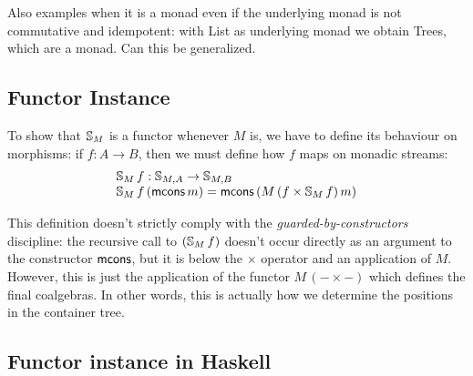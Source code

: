 \documentclass{article}
\begin{document}
Also examples when it is a monad even if the underlying monad is not commutative and idempotent: with List as underlying monad we obtain Trees, which are a monad. Can this be generalized.

\subsection{Functor Instance}

To show that $\mathbb{S}_{M}$ is a functor whenever $M$ is, we have to define its behaviour on morphisms: if $f:A\rightarrow B$, then we must define how $f$ maps on monadic streams:
$$
\begin{array}{l}
\mathbb{S}_{M}\,f : \mathbb{S}_{M,A} \rightarrow \mathbb{S}_{M,B}\\
\mathbb{S}_{M}\,f\,(\mathsf{mcons}\,m) = \mathsf{mcons}\,(M\,(f\times \mathbb{S}_{M}\,f)\,m)
\end{array}
$$

This definition doesn't strictly comply with the {\em guarded-by-constructors} discipline: the recursive call to $(\mathbb{S}_{M}\,f)$ doesn't occur directly as an argument to the constructor $\mathsf{mcons}$, but it is below the $\times$ operator and an application of $M$.
However, this is just the application of the functor $M\,(- \times -)$ which defines the final coalgebras. In other words, this is actually how we determine the positions in the container tree.
















\subsection{Functor instance in Haskell}

\end{document}
